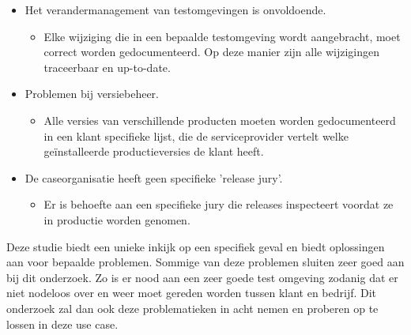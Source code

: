 \begin{itemize}
\begin{itemize}
    \end{itemize}
    \item Het verandermanagement van testomgevingen is onvoldoende.
    \begin{itemize}
        \item Elke wijziging die in een bepaalde testomgeving wordt aangebracht, moet correct worden gedocumenteerd. Op deze manier zijn alle wijzigingen traceerbaar en up-to-date.
    \end{itemize}
    \item Problemen bij versiebeheer.
    \begin{itemize}
        \item Alle versies van verschillende producten moeten worden gedocumenteerd in een klant specifieke lijst, die de serviceprovider vertelt welke geïnstalleerde productieversies de klant heeft.
    \end{itemize}
    \item De caseorganisatie heeft geen specifieke 'release jury'.
    \begin{itemize}
        \item Er is behoefte aan een specifieke jury die releases inspecteert voordat ze in productie worden genomen.
    \end{itemize}
\end{itemize}
Deze studie \autocite{Lahtela2011} biedt een unieke inkijk op een specifiek geval en biedt oplossingen aan voor bepaalde problemen. Sommige van deze problemen sluiten zeer goed aan bij dit onderzoek. Zo is er nood aan een zeer goede test omgeving zodanig dat er niet nodeloos over en weer moet gereden worden tussen klant en bedrijf. Dit onderzoek zal dan ook deze problematieken in acht nemen en proberen op te lossen in deze use case.

